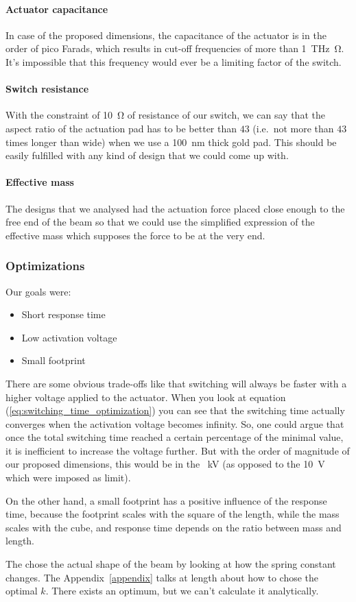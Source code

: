 \paragraph{Actuator capacitance}
In case of the proposed dimensions, the capacitance of the actuator is in the order of pico Farads, which results in cut-off frequencies of more than \SI{1}{\tera\hertz\ohm}.
It's impossible that this frequency would ever be a limiting factor of the switch.

\paragraph{Switch resistance}
With the constraint of \SI{10}{\ohm} of resistance of our switch, we can say that the aspect ratio of the actuation pad has to be better than $43$ (i.e.\ not more than $43$ times longer than wide) when we use a \SI{100}{\nano\meter} thick gold pad.
This should be easily fulfilled with any kind of design that we could come up with.

\paragraph{Effective mass}
The designs that we analysed had the actuation force placed close enough to the free end of the beam so that we could use the simplified expression of the effective mass which supposes the force to be at the very end.


\subsubsection{Optimizations}
\label{ssub:optimizations}

Our goals were:

\begin{itemize}
    \item Short response time
    \item Low activation voltage
    \item Small footprint
\end{itemize}

There are some obvious trade-offs like that switching will always be faster with a higher voltage applied to the actuator.
When you look at equation (\ref{eq:switching_time_optimization}) you can see that the switching time actually converges when the activation voltage becomes infinity.
So, one could argue that once the total switching time reached a certain percentage of the minimal value, it is inefficient to increase the voltage further.
But with the order of magnitude of our proposed dimensions, this would be in the \SI{}{\kilo\volt} (as opposed to the \SI{10}{\volt} which were imposed as limit).

On the other hand, a small footprint has a positive influence of the response time, because the footprint scales with the square of the length, while the mass scales with the cube, and response time depends on the ratio between mass and length.

The chose the actual shape of the beam by looking at how the spring constant changes.
The Appendix~\ref{appendix} talks at length about how to chose the optimal $k$.
There exists an optimum, but we can't calculate it analytically.
